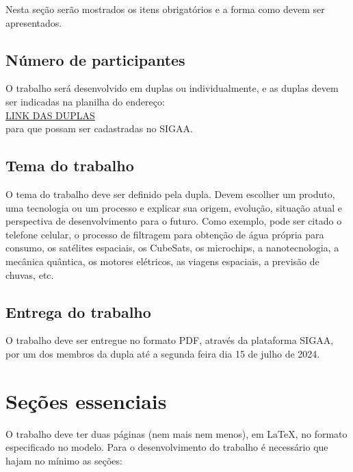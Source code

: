 \documentclass[conference]{ModeloA}
\begin{document}
Nesta seção serão mostrados os itens obrigatórios e a forma como devem ser apresentados.

\subsection{Número de participantes}
 O trabalho será desenvolvido em duplas ou individualmente, e as duplas devem ser indicadas na planilha do endereço:\\ 
  \href{https://docs.google.com/spreadsheets/d/1l2WnmjrgzaTikbDhNdt9FAAWOUk1IO63smh_fKgjOUs/edit?usp=sharing}{LINK DAS DUPLAS}\\ 
 para que possam ser cadastradas no SIGAA.

\subsection{Tema do trabalho}

O tema do trabalho deve ser definido pela dupla. Devem escolher um produto, uma tecnologia ou um processo e explicar sua origem, evolução, situação atual e perspectiva de desenvolvimento para o futuro. Como exemplo, pode ser citado o telefone celular, o processo de filtragem para obtenção de água própria para consumo, os satélites espaciais, os CubeSats, os microchips, a nanotecnologia, a mecânica quântica, os motores elétricos, as viagens espaciais, a previsão de chuvas, etc.

\subsection{Entrega do trabalho}

O trabalho deve ser entregue no formato PDF, através da plataforma SIGAA, por um dos membros da dupla até a segunda feira dia 15 de julho de 2024.

	
\section{Seções essenciais}

O trabalho deve ter duas páginas (nem mais nem menos), em \LaTeX, no formato especificado no modelo.
Para o desenvolvimento do trabalho é necessário que hajam no mínimo as seções:\\
\end{document}
